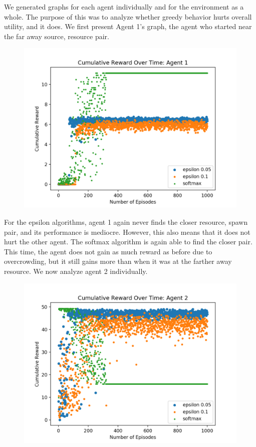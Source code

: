 \documentclass[11pt]{article}
\begin{document}
We generated graphs for each agent individually and for the environment as a whole. The purpose of this was to analyze whether greedy behavior hurts overall utility, and it does. We first present Agent 1's graph, the agent who started near the far away source, resource pair.


\begin{figure}[H]
  \centering
  \includegraphics[width=.7\textwidth]{ai-env2-agent1.png}
\end{figure}

For the epsilon algorithms, agent 1 again never finds the closer resource, spawn pair, and its performance is mediocre. However, this also means that it does not hurt the other agent. The softmax algorithm is again able to find the closer pair. This time, the agent does not gain as much reward as before due to overcrowding, but it still gains more than when it was at the farther away resource. We now analyze agent 2 individually.

\begin{figure}[H]
  \centering
  \includegraphics[width=.7\textwidth]{ai-env2-agent2}
\end{figure}
\end{document}
